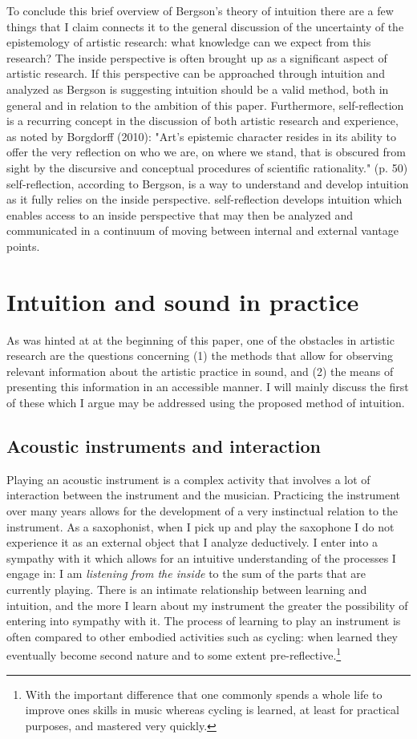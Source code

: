 \documentclass[11pt]{article}
\makeatletter
\newcommand{\cslcitation}[2]
 {\protect\hyper@linkstart{cite}{citeproc_bib_item_#1}#2\hyper@linkend}
\makeatother
\begin{document}
To conclude this brief overview of Bergson's theory of intuition there are a few things that I claim connects it to the general discussion of the uncertainty of the epistemology of artistic research: what knowledge can we expect from this research? The inside perspective is often brought up as a significant aspect of artistic research.
If this perspective can be approached through intuition and analyzed as Bergson is suggesting intuition should be a valid method, both in general and in relation to the ambition of this paper.
Furthermore, self-reflection is a recurring concept in the discussion of both artistic research and experience, as noted by Borgdorff (\cslcitation{5}{2010}): "Art’s epistemic character resides in its ability to offer the very reflection on who we
are, on where we stand, that is obscured from sight by the discursive and conceptual
procedures of scientific rationality." (p. 50)
self-reflection, according to Bergson, is a way to understand and develop intuition as it fully relies on the inside perspective.
self-reflection develops intuition which enables access to an inside perspective that may then be analyzed and communicated in a continuum of moving between internal and external vantage points.
\section*{Intuition and sound in practice}
\label{sec:orgdad0777}
As was hinted at at the beginning of this paper, one of the obstacles in artistic research are the questions concerning (1) the methods that allow for observing relevant information about the artistic practice in sound, and (2) the means of presenting this information in an accessible manner.
I will mainly discuss the first of these which I argue may be addressed using the proposed method of intuition.
\subsection*{Acoustic instruments and interaction}
\label{sec:orgb929133}
Playing an acoustic instrument is a complex activity that involves a lot of interaction between the instrument and the musician. Practicing the instrument over many years allows for the development of a very instinctual relation to the instrument.
As a saxophonist, when I pick up and play the saxophone I do not experience it as an external object that I analyze deductively.
I enter into a sympathy with it which allows for an intuitive understanding of the processes I engage in: I am \emph{listening from the inside} to the sum of the parts that are currently playing.
There is an intimate relationship between learning and intuition, and the more I learn about my instrument the greater the possibility of entering into sympathy with it.
The process of learning to play an instrument is often compared to other embodied activities such as cycling: when learned they eventually become second nature and to some extent pre-reflective.\footnote{With the important difference that one commonly spends a whole life to improve ones skills in music whereas cycling is learned, at least for practical purposes, and mastered very quickly.}
\end{document}
